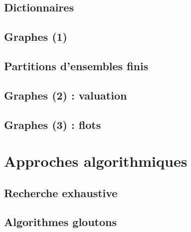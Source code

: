 \documentclass{minitelreport}
\begin{document}
\begin{refsection}
		\section{Dictionnaires}
			\label{sec:dictionnaires}
			
		\newpage
		\section{Graphes (1)}
			\label{sec:graphes}
			
		\newpage
		\section{Partitions d'ensembles finis}
			\label{sec:partitions}
			
		\newpage
		\section{Graphes (2) : valuation}
			\label{sec:graphes_values}
			
		\newpage
		\section{Graphes (3) : flots}
			\label{sec:graphes_et_flots}
			
	\chapter{Approches algorithmiques}
	\label{cha:approches_algorithmiques}
		\section{Recherche exhaustive}
			\label{sec:recherche_exhaustive}
			
		\section{Algorithmes gloutons}
			\label{sec:algorithmes_gloutons}
			

\end{refsection}
\end{document}
